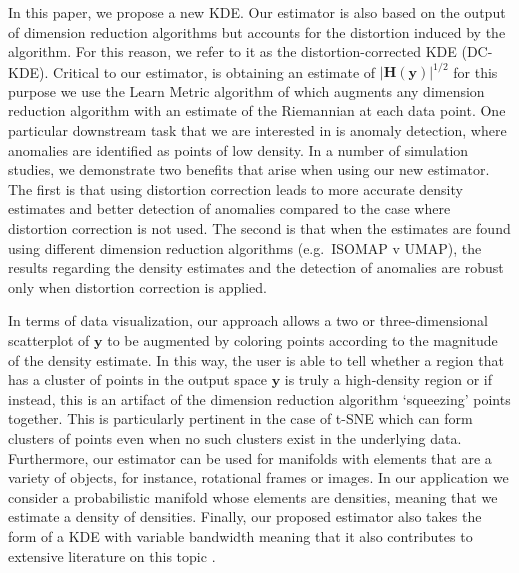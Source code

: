 \documentclass[12pt]{article}
\begin{document}
In this paper, we propose a new KDE. Our estimator is also based on the output of dimension reduction algorithms but accounts for the distortion induced by the algorithm. For this reason, we refer to it as the distortion-corrected KDE (DC-KDE). Critical to our estimator, is obtaining an estimate of \(|\bm{H}(\bm{y})|^{1/2}\) for this purpose we use the Learn Metric algorithm of \textcite{Perrault-Joncas2013-pq} which augments any dimension reduction algorithm with an estimate of the Riemannian at each data point. One particular downstream task that we are interested in is anomaly detection, where anomalies are identified as points of low density. In a number of simulation studies, we demonstrate two benefits that arise when using our new estimator. The first is that using distortion correction leads to more accurate density estimates and better detection of anomalies compared to the case where distortion correction is not used. The second is that when the estimates are found using different dimension reduction algorithms (e.g.~ISOMAP v UMAP), the results regarding the density estimates and the detection of anomalies are robust only when distortion correction is applied.

In terms of data visualization, our approach allows a two or three-dimensional scatterplot of \(\bm{y}\) to be augmented by coloring points according to the magnitude of the density estimate. In this way, the user is able to tell whether a region that has a cluster of points in the output space \(\bm{y}\) is truly a high-density region or if instead, this is an artifact of the dimension reduction algorithm `squeezing' points together. This is particularly pertinent in the case of t-SNE which can form clusters of points even when no such clusters exist in the underlying data. Furthermore, our estimator can be used for manifolds with elements that are a variety of objects, for instance, rotational frames or images. In our application we consider a probabilistic manifold whose elements are densities, meaning that we estimate a density of densities. Finally, our proposed estimator also takes the form of a KDE with variable bandwidth meaning that it also contributes to extensive literature on this topic \autocite[see Section 6.6 of][ for a summary]{Scott2015-vl}.
\end{document}
